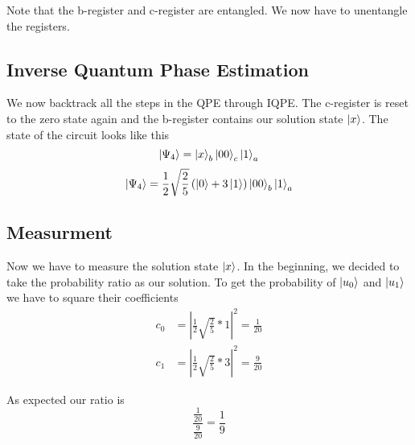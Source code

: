     Note that the b-register and c-register are entangled. We now have to unentangle the registers.

\subsection{Inverse Quantum Phase Estimation}
    We now backtrack all the steps in the QPE through IQPE.
    The c-register is reset to the zero state again and the b-register contains our solution state $\ket x$.
    The state of the circuit looks like this
    \begin{equation}
    \ket{\Psi_4}= \ket{x}_b \ket{00}_c \ket{1}_a 
    \end{equation}
    \begin{equation}
    \ket{\Psi_4}=\frac{1}{2}\sqrt{\frac{2}{5}}  \left(\ket{0} +3 \ket{1} \right) \ket{00}_b \ket{1}_a
    \end{equation}

\subsection{Measurment}
    Now we have to measure the solution state $\ket x$.
    In the beginning, we decided to take the probability ratio as our solution. 
    To get the probability of $\ket{u_0}$ and $\ket{u_1}$ we have to square their coefficients
\begin{equation}
\begin{split}
c_0&=\left|\frac{1}{2}\sqrt{\frac{2}{5}}*1\right|^2 = \frac{1}{20}\\
c_1&=\left|\frac{1}{2}\sqrt{\frac{2}{5}}*3\right|^2 = \frac{9}{20}
\end{split}
\end{equation}

As expected our ratio is 
\begin{equation}
 \frac{\frac{1}{20}}{ \frac{9}{20} } = \frac 1 9
\end{equation}

